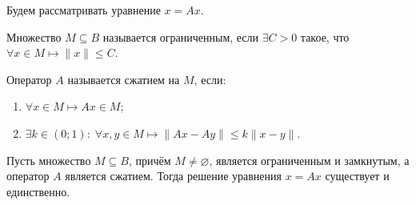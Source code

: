 Будем рассматривать уравнение $x = Ax$.

\begin{definition}
	Множество $M \subseteq B$ называется ограниченным, если $\exists C > 0$ такое, что $\forall x \in M \longmapsto \|x\| \leqslant C$.
\end{definition}

\begin{definition}
	Оператор $A$ называется сжатием на $M$, если:
	\begin{enumerate}
		\item $\forall x \in M \longmapsto Ax \in M$;
		
		\item $\exists k \in (0; 1): \; \forall x, y \in M \longmapsto \|Ax - Ay\| \leqslant k\|x -y\|$.
	\end{enumerate}
\end{definition}

\begin{theorem}
	
	Пусть множество $M \subseteq B$, причём $M \neq \varnothing$, является ограниченным и замкнутым, а оператор $A$ является сжатием. Тогда решение уравнения $x = Ax$ существует и единственно.
\end{theorem}

